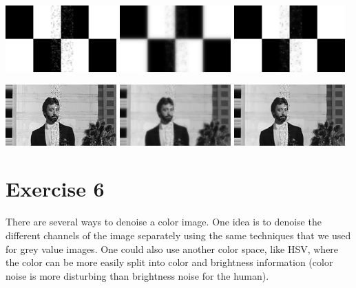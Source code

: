 \documentclass[a4paper,11pt, final]{scrartcl}
\begin{document}
{
\centering 
\includegraphics[width=0.32\textwidth]{ex5_checker_noise.png}
\includegraphics[width=0.32\textwidth]{ex5_checker_mrf_gaussian_filtered.png}
\includegraphics[width=0.32\textwidth]{ex5_checker_mrf_student_filtered.png}
}

{
\centering 
\includegraphics[width=0.32\textwidth]{ex5_image_noise.png}
\includegraphics[width=0.32\textwidth]{ex5_image_mrf_gaussian_filtered.png}
\includegraphics[width=0.32\textwidth]{ex5_image_mrf_student_filtered.png}
}

\section*{Exercise 6}
There are several ways to denoise a color image.
One idea is to denoise the different channels of the image separately using the same techniques that we used for grey value images.
One could also use another color space, like HSV, where the color can be more easily split into color and brightness information (color noise is more disturbing than brightness noise for the human). 
\end{document}
